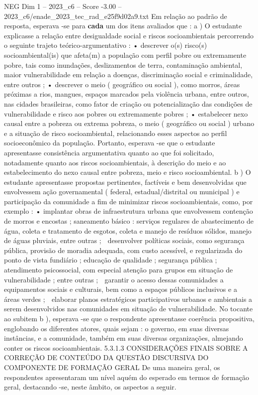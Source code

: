 \begin{textsample}{NEG Dim 1 – 2023\_c6 – Score -3.00 – 2023\_c6/enade\_2023\_tec\_rad\_e25f9d02a9.txt}
Em relação ao padrão de resposta, esperava -se para \textbf{cada} um dos itens avaliados que : a ) O estudante explicasse a relação entre desigualdade social e riscos socioambientais percorrendo o seguinte trajeto teórico-argumentativo : • descrever o(s) risco(s) socioambiental(is) que afeta(m) a população com perfil pobre ou extremamente pobre, tais como inundações, deslizamentos de terra, contaminação ambiental, maior vulnerabilidade em relação a doenças, discriminação social e criminalidade, entre outros ; • descrever o meio ( geográfico ou social ), como morros, áreas próximas a rios, mangues, espaços marcados pela violência urbana, entre outros, nas cidades brasileiras, como fator de criação ou potencialização das condições de vulnerabilidade e risco aos pobres ou extremamente pobres ; • estabelecer nexo causal entre a pobreza ou extrema pobreza, o meio ( geográfico ou social ) urbano e a situação de risco socioambiental, relacionando esses aspectos ao perfil socioeconômico da população.
Portanto, esperava -se que o estudante apresentasse consistência argumentativa quanto ao que foi solicitado, notadamente quanto aos riscos socioambientais, à descrição do meio e ao estabelecimento do nexo causal entre pobreza, meio e risco socioambiental. b ) O estudante apresentasse propostas pertinentes, factíveis e bem desenvolvidas que envolvessem ação governamental ( federal, estadual/distrital ou municipal ) e participação da comunidade a fim de minimizar riscos socioambientais, como, por exemplo : • implantar obras de infraestrutura urbana que envolvessem contenção de morros e encostas ; saneamento básico : serviços regulares de abastecimento de água, coleta e tratamento de esgotos, coleta e manejo de resíduos sólidos, manejo de águas pluviais, entre outras ;  desenvolver políticas sociais, como segurança pública, provisão de moradia adequada, com custo acessível, e regularizada do ponto de vista fundiário ; educação de qualidade ; segurança pública ; atendimento psicossocial, com especial atenção para grupos em situação de vulnerabilidade ; entre outras ;  garantir o acesso dessas comunidades a equipamentos sociais e culturais, bem como a espaços públicos inclusivos e a áreas verdes ;  elaborar planos estratégicos participativos urbanos e ambientais a serem desenvolvidos nas comunidades em situação de vulnerabilidade.
No tocante ao subitem b ), esperava -se que o respondente apresentasse coerência propositiva, englobando os diferentes atores, quais sejam : o governo, em suas diversas instâncias, e a comunidade, também em suas diversas organizações, almejando conter os riscos socioambientais. 5.3.1.3 CONSIDERAÇÕES FINAIS SOBRE A CORREÇÃO DE CONTEÚDO DA QUESTÃO DISCURSIVA DO COMPONENTE DE FORMAÇÃO GERAL De uma maneira geral, os respondentes apresentaram um nível aquém do esperado em termos de formação geral, destacando -se, neste âmbito, os aspectos a seguir.

\end{textsample}
